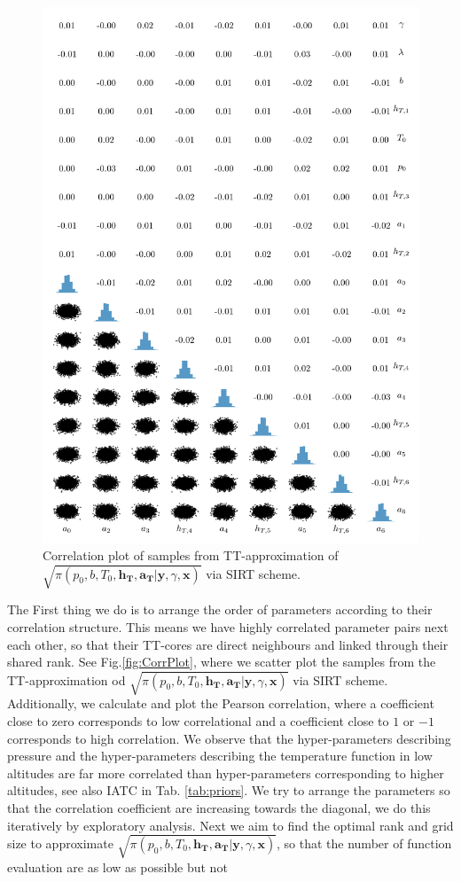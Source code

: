 \begin{figure}%
	\includegraphics[]{2ndCorrPlot.png}
	\caption*{Correlation plot of samples from TT-approximation of $\sqrt{\pi(p_0,b,T_0,\bm{h_T},\bm{a_T} | \bm{y}, \gamma, \bm{x})}$ via SIRT scheme.}
\end{figure}
\cleardoublepage
The First thing we do is to arrange the order of parameters according to their correlation structure.
This means we have highly correlated parameter pairs next each other, so that their TT-cores are direct neighbours and linked through their shared rank.
See Fig.\ref{fig:CorrPlot}, where we scatter plot the samples from the TT-approximation od $\sqrt{\pi(p_0,b,T_0,\bm{h_T},\bm{a_T} | \bm{y}, \gamma, \bm{x})}$ via SIRT scheme.
Additionally, we calculate and plot the Pearson correlation, where a coefficient close to zero corresponds to low correlational and a coefficient close to $1$ or $-1$ corresponds to high correlation.
We observe that the hyper-parameters describing pressure and the hyper-parameters describing the temperature function in low altitudes are far more correlated than hyper-parameters corresponding to higher altitudes, see also IATC in Tab. \ref{tab:priors}.
We try to arrange the parameters so that the correlation coefficient are increasing towards the diagonal, we do this iteratively by exploratory analysis.
Next we aim to find the optimal rank and grid size to approximate $\sqrt{\pi(p_0,b,T_0,\bm{h_T},\bm{a_T} | \bm{y}, \gamma, \bm{x})}$, so that the number of function evaluation are as low as possible but not 


